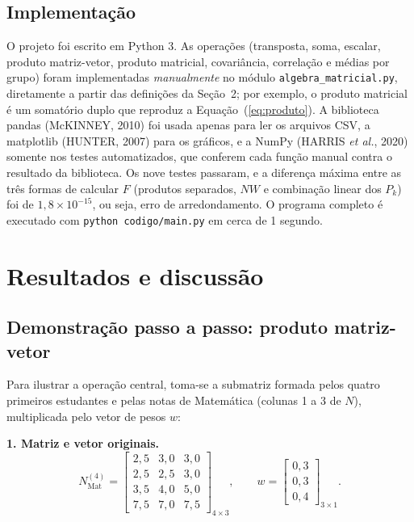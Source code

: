 \documentclass[12pt,a4paper]{article}
\begin{document}
\subsection{Implementação}

O projeto foi escrito em Python 3. As operações (transposta, soma, escalar, produto matriz-vetor, produto matricial, covariância, correlação e médias por grupo) foram implementadas \emph{manualmente} no módulo \texttt{algebra\_matricial.py}, diretamente a partir das definições da Seção~2; por exemplo, o produto matricial é um somatório duplo que reproduz a Equação~(\ref{eq:produto}). A biblioteca pandas (McKINNEY, 2010) foi usada apenas para ler os arquivos CSV, a matplotlib (HUNTER, 2007) para os gráficos, e a NumPy (HARRIS \textit{et al.}, 2020) somente nos testes automatizados, que conferem cada função manual contra o resultado da biblioteca. Os nove testes passaram, e a diferença máxima entre as três formas de calcular $F$ (produtos separados, $NW$ e combinação linear dos $P_k$) foi de $1{,}8\times 10^{-15}$, ou seja, erro de arredondamento. O programa completo é executado com \texttt{python codigo/main.py} em cerca de 1 segundo.

\section{Resultados e discussão}

\subsection{Demonstração passo a passo: produto matriz-vetor}

Para ilustrar a operação central, toma-se a submatriz formada pelos quatro primeiros estudantes e pelas notas de Matemática (colunas 1 a 3 de $N$), multiplicada pelo vetor de pesos $w$:

\textbf{1. Matriz e vetor originais.}
\[
N_{\text{Mat}}^{(4)}=\begin{bmatrix}
2{,}5 & 3{,}0 & 3{,}0\\ 2{,}5 & 2{,}5 & 3{,}0\\ 3{,}5 & 4{,}0 & 5{,}0\\ 7{,}5 & 7{,}0 & 7{,}5
\end{bmatrix}_{4\times 3},
\qquad
w=\begin{bmatrix}0{,}3\\0{,}3\\0{,}4\end{bmatrix}_{3\times 1}.
\]
\end{document}
